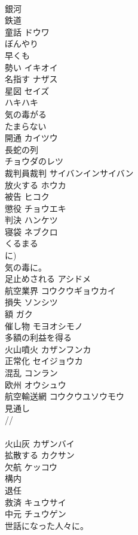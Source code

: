 \documentclass[8pt]{extreport}
\begin{document}
\begin{CJK}{UTF8}{min}
\\	銀河	
\\	鉄道	
\\	童話	ドウワ 
\\	ぼんやり	
\\	早くも	
\\	勢い	イキオイ 
\\	名指す	ナザス 
\\	星図	セイズ 
\\	ハキハキ	
\\	気の毒がる	
\\	たまらない	
\\	開通	カイツウ 
\\	長蛇の列	
\\	チョウダのレツ
\\	裁判員裁判	サイバンインサイバン 
\\	放火する	ホウカ 
\\	被告	ヒコク 
\\	懲役	チョウエキ 
\\	判決	ハンケツ 
\\	寝袋	ネブクロ 
\\	くるまる	
\\	に)
\\	気の毒に。	
\\	足止めされる	アシドメ 
\\	航空業界	コウクウギョウカイ 
\\	損失	ソンシツ 
\\	額	ガク 
\\	催し物	モヨオシモノ 
\\	多額の利益を得る	
\\	火山噴火	カザンフンカ 
\\	正常化	セイジョウカ 
\\	混乱	コンラン 
\\	欧州	オウシュウ 
\\	航空輸送網	コウクウユソウモウ 
\\	見通し	
\\	[みとおしの悪い道路]//
\\	[来年度の見通し]
\\	火山灰	カザンバイ 
\\	拡散する	カクサン 
\\	欠航	ケッコウ 
\\	構内	
\\	退任	
\\	救済	キュウサイ 
\\	中元	チュウゲン 
\\	世話になった人々に。

\end{CJK}
\end{document}
